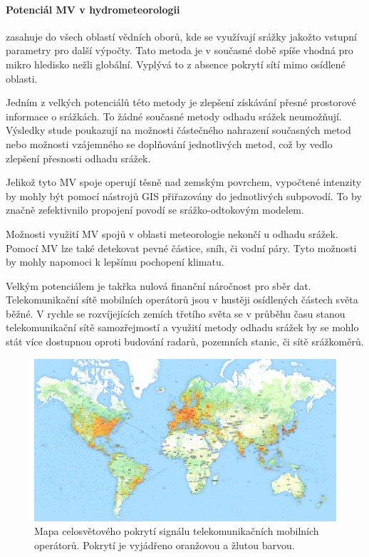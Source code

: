 \documentclass[a4paper,12pt]{article}
\begin{document}
\paragraph*{Potenciál MV v hydrometeorologii} zasahuje do všech oblastí vědních oborů, kde se využívají srážky jakožto vstupní parametry pro další výpočty. Tato metoda je v současné době spíše vhodná pro mikro hledisko nežli globální. Vyplývá to z absence pokrytí sítí mimo osídlené oblasti. 

Jedním z velkých potenciálů této metody je zlepšení získávání přesné prostorové informace o srážkách. To žádné současné metody odhadu srážek neumožňují. Výsledky stude\cite{mv2} poukazují na možnosti částečného nahrazení současných metod nebo možnosti vzájemného se doplňování jednotlivých metod, což by vedlo zlepšení přesnosti odhadu srážek. 

Jelikož tyto MV spoje operují těsně nad zemským povrchem, vypočtené intenzity by mohly být pomocí nástrojů \acs{GIS} přiřazovány do jednotlivých subpovodí. To by značně zefektivnilo propojení povodí se srážko-odtokovým modelem.

Možnosti využití MV spojů v oblasti meteorologie nekončí u odhadu srážek. Pomocí MV lze také detekovat pevné částice, sníh, či vodní páry. Tyto možnosti by mohly napomoci k lepšímu pochopení klimatu.\cite{mv2}

Velkým potenciálem je takřka nulová finanční náročnost pro sběr dat. Telekomunikační sítě mobilních operátorů jsou v hustěji osídlených částech světa běžné. V rychle se rozvíjejících zemích třetího světa se v průběhu času stanou telekomunikační sítě samozřejmostí a využití metody odhadu srážek by se mohlo stát více dostupnou oproti budování radarů, pozemních stanic, či sítě srážkoměrů.
 
\begin{figure}[h!]
    \centering
    \includegraphics[width=1\textwidth]{./img/srazky/opensignalmap.png}
    \caption[Porytí tel. sítí]{\centering Mapa celosvětového pokrytí signálu telekomunikačních mobilních operátorů. Pokrytí je vyjádřeno oranžovou a žlutou barvou.  \footnotemark }
 \end{figure}   
\end{document}

